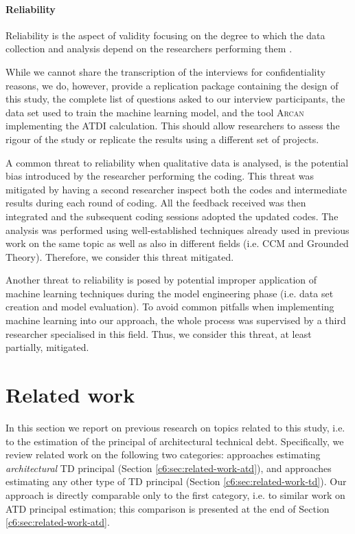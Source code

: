 \paragraph*{Reliability}
Reliability is the aspect of validity focusing on the degree to which the data collection and analysis depend on the researchers performing them \cite{Runeson2012}.

While we cannot share the transcription of the interviews for confidentiality reasons, we do, however, provide a replication package \cite{ReplicationPackageC6} containing the design of this study, the complete list of questions asked to our interview participants, the data set used to train the machine learning model, and the tool \textsc{Arcan} implementing the ATDI calculation.
This should allow researchers to assess the rigour of the study or replicate the results using a different set of projects.

A common threat to reliability when qualitative data is analysed, is the potential bias introduced by the researcher performing the coding.
This threat was mitigated by having a second researcher inspect both the codes and intermediate results during each round of coding. All the feedback received was then integrated and the subsequent coding sessions adopted the updated codes.
The analysis was performed using well-established techniques already used in previous work on the same topic as well as also in different fields (i.e. CCM and Grounded Theory).
Therefore, we consider this threat mitigated.

Another threat to reliability is posed by potential improper application of machine learning techniques during the model engineering phase (i.e. data set creation and model evaluation). 
To avoid common pitfalls when implementing machine learning into our approach, 
the whole process was supervised by a third researcher specialised in this field.
Thus, we consider this threat, at least partially, mitigated.


\section{Related work}\label{c6:sec:related-work}
In this section we report on previous research on topics related to this study, i.e. to the estimation of the principal of architectural technical debt. Specifically, we review related work on the following two categories: approaches estimating \emph{architectural} TD principal (Section \ref{c6:sec:related-work-atd}), and approaches estimating any other type of TD principal (Section \ref{c6:sec:related-work-td}).
Our approach is directly comparable only to the first category, i.e. to similar work on ATD principal estimation; this comparison is presented at the end of Section \ref{c6:sec:related-work-atd}.

